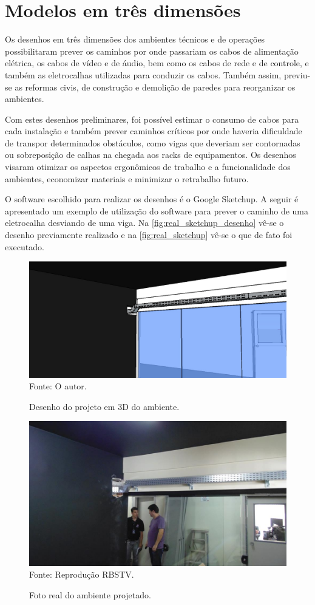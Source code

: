\documentclass[
	12pt,				%
	oneside,			%
	a4paper,			%
	brazil
	]{abntex2}
\begin{document}
\section{Modelos em três dimensões}

Os desenhos em três dimensões dos ambientes técnicos e de operações possibilitaram prever os caminhos por onde passariam os cabos de alimentação elétrica, os cabos de vídeo e de áudio, bem como os cabos de rede e de controle, e também as eletrocalhas utilizadas para conduzir os cabos. Também assim, previu-se as reformas civis, de construção e demolição de paredes para reorganizar os ambientes.

Com estes desenhos preliminares, foi possível estimar o consumo de cabos para cada instalação e também prever caminhos críticos por onde haveria dificuldade de transpor determinados obstáculos, como vigas que deveriam ser contornadas ou sobreposição de calhas na chegada aos racks de equipamentos. Os desenhos visaram otimizar os aspectos ergonômicos de trabalho e a funcionalidade dos ambientes, economizar materiais e minimizar o retrabalho futuro.

O software escolhido para realizar os desenhos é o Google Sketchup. A seguir é apresentado um exemplo de utilização do software para prever o caminho de uma eletrocalha desviando de uma viga. Na \autoref{fig:real_sketchup_desenho} vê-se o desenho previamente realizado e na \autoref{fig:real_sketchup} vê-se o que de fato foi executado.

\begin{figure}[!h]
\centering
\caption{Desenho do projeto em 3D do ambiente.}
\includegraphics[width=0.8\linewidth]{figuras/real_sketchup_desenho.jpg}
\\Fonte: O autor.
\label{fig:real_sketchup_desenho}
\end{figure}

\begin{figure}[!h]
\centering
\caption{Foto real do ambiente projetado.}
\includegraphics[width=0.8\linewidth]{figuras/real_sketchup.jpg}
\\Fonte: Reprodução RBSTV.
\label{fig:real_sketchup}
\end{figure}
\end{document}
